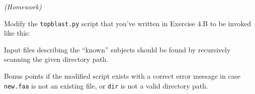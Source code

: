 \documentclass[english,serif,mathserif,xcolor=pdftex,dvipsnames,table]{beamer}
\begin{document}
\begin{frame}[fragile]
  \begin{exercise*}[4.C] \emph{(Homework)}

    Modify the \texttt{topblast.py} script that you've written in Exercise 4.B
    to be invoked like this:

    \+ Input files describing the ``known'' subjects should be found by
    recursively scanning the given directory path.

    \+ Bonus points if the modified script exists with a correct error
    message in case \texttt{new.faa} is not an existing file, or
    \texttt{dir} is not a valid directory path.
  \end{exercise*}
\end{frame}
\end{document}

